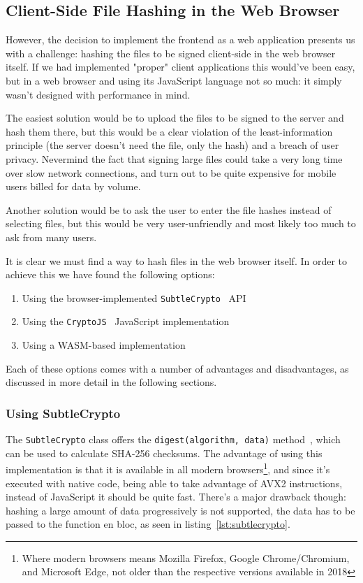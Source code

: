 \subsection{Client-Side File Hashing in the Web Browser}
\label{subsec:browserhashing}
However, the decision to implement the frontend as a web application presents us with a challenge:
hashing the files to be signed client-side in the web browser itself.
If we had implemented "proper" client applications this would've been easy, but in a web browser and using its
JavaScript language not so much: it simply wasn't designed with performance in mind.

The easiest solution would be to upload the files to be signed to the server and hash them there,
but this would be a clear violation of the least-information principle (the server doesn't need the file, only the hash)
and a breach of user privacy.
Nevermind the fact that signing large files could take a very long time over slow network connections,
and turn out to be quite expensive for mobile users billed for data by volume.

Another solution would be to ask the user to enter the file hashes instead of selecting files,
but this would be very user-unfriendly and most likely too much to ask from many users.

It is clear we must find a way to hash files in the web browser itself.
In order to achieve this we have found the following options:

\begin{enumerate}
    \item Using the browser-implemented \texttt{SubtleCrypto}~\cite{subtlecrypto} \gls{API}
    \item Using the \texttt{CryptoJS}~\cite{cryptojs} JavaScript implementation
    \item Using a \gls{WASM}-based implementation
\end{enumerate}

Each of these options comes with a number of advantages and disadvantages, as discussed in more detail in the following sections.

\subsubsection{Using SubtleCrypto}
\label{subsec:subtlecrypto}
The \texttt{SubtleCrypto} class offers the \texttt{digest(algorithm, data)} method~\cite{subtlecrypto}, which can be used to
calculate \gls{SHA-256} checksums.
The advantage of using this implementation is that it is available in all modern browsers\footnote{Where modern browsers means Mozilla Firefox, Google Chrome/Chromium, and Microsoft Edge, not older than the respective versions available in 2018},
and since it's executed with native code, being able to take advantage of \gls{AVX2} instructions, instead of JavaScript it should be quite fast.
There's a major drawback though: hashing a large amount of data progressively is not supported, the data has to be
passed to the function en bloc, as seen in listing~\ref{lst:subtlecrypto}.

